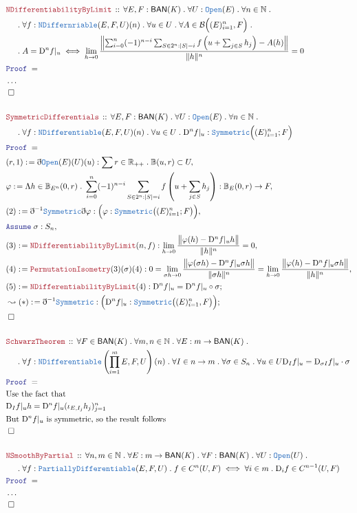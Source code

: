 \documentclass[12pt]{scrartcl}
\newcommand{\TYPE}[1]{\textcolor{NavyBlue}{\mathtt{#1}}}
\newcommand{\LOGIC}[1]{\textcolor{Blue}{\mathtt{#1}}}
\newcommand{\THM}[1]{\textcolor{Maroon}{\mathtt{#1}}}
\renewcommand{\.}{\; . \;}
\newcommand{\de}{: \kern 0.1pc =}
\newcommand{\Theorem}[2]{& \THM{#1} \, :: \, #2 \\ & \Proof = \\ }
\newcommand{\NewLine}{\\ & \kern 1pc}
\newcommand{\Page}[1]{\begin{align*} #1 \end{align*}   }
\newcommand{ \bd }{ \ByDef }
\newcommand{\NoProof}{ & \ldots \\ \EndProof}
\newcommand{\Reals}{\mathbb{R} }
\newcommand{\Nat}{\mathbb{N} }
\newcommand{\Say}[3]{& #1 \de #2 : #3, \\}
\newcommand{\Conclude}[3]{& #1 \de #2 : #3; \\}
\newcommand{\DeriveConclude}[3]{& \leadsto #1 \de #2 : #3 ; \\}
\newcommand{\A}{\LOGIC{Assume} \;}
\newcommand{\Assume}[2]{& \A #1 : #2, \\}
\newcommand{\QED}{\; \square}
\newcommand{\EndProof}{& \QED \\}
\newcommand{\ByDef}{\eth}
\newcommand{\Proof}{\LOGIC{Proof} \; }
\newcommand{\Ball}{ \mathbb{B} }
\newcommand{\BAN}{\mathsf{BAN}} %
\newcommand{\D}{\mathrm{D}}
\newcommand{\B}{\mathcal{B}}
\begin{document}
\Page{
	\Theorem{NDifferentiabilityByLimit}{
		\forall E,F : \BAN(K) \. \forall U : \TYPE{Open}(E) \. \forall n \in \Nat \.
		\NewLine \.
		\forall f : \TYPE{NDiffernriable}(E,F,U)(n) \.
		\forall u \in U \. \forall A \in \B\Big( (E )^n_{i = 1} , F \Big) \.
		\NewLine \.
		A = \D^n f |_u \iff 
		\lim_{h \to 0} \frac{\left\| \sum^n_{i=0} (-1)^{n-i} \sum_{S \in 2^n : |S| = i}f\left( u + \sum_{j \in S}h_j \right) - A(h)     \right\|}{\|h\|^n} = 0
	}
	\NoProof
	\\
	\Theorem{SymmetricDifferentials}{ 
		\forall E,F : \BAN(K) \. \forall U : \TYPE{Open}(E) \. \forall n \in \Nat \.
		\NewLine \.
		 \forall f : \TYPE{NDifferentiable}(E,F,U)(n) \.
		\forall u \in U \. \D^n f |_u : \TYPE{Symmetric}\Big( (E)^n_{i=1}  ; F\Big)
		}
	\Say{(r,1)}{\bd \TYPE{Open}(E)(U)(u)}{\sum r \in \Reals_{++} \. \Ball(u,r) \subset U}
	\Say{\varphi}{ \Lambda h \in \Ball_{E^n}(0,r) \. \sum^n_{i = 0}(-1)^{n - i} \sum_{S \in 2^n : |S| = i}f\left( u + \sum_{j \in S} h_j \right)   }{ \Ball_E(0,r) \to F }
	\Say{(2)}{\bd^{-1} \TYPE{Symmetric} \bd \varphi}{\Big( \varphi : \TYPE{Symmetric}\big( (E)^n_{i=1} ; F \big)  \Big)}
	\Assume{\sigma}{S_n}
	\Say{(3)}{\THM{NDifferentiabilityByLimit}(n,f)}{ \lim_{h \to 0 } \frac{\big\| \varphi(h) - \D^n f |_u h \big\|}{\|h\|^n} = 0   }
	\Say{(4)}{\THM{PermutationIsometry}(3)(\sigma)(4)}{ 
		0 = 
		\lim_{\sigma h \to 0} \frac{ \big\|\varphi(\sigma h) - \D^n f |_u \sigma h \big\|}{\|\sigma h\|^n} = 
		\lim_{h \to 0} \frac{\big\|\varphi(h) - \D^n f |_u \sigma h \big\|}{\| h \|^n}
	}
	\Conclude{(5)}{\THM{NDifferentiabilityByLimit}(4)}{\D^n f |_u = \D^n f |_u \circ \sigma}
	\DeriveConclude{(*)}{\bd^{-1}\TYPE{Symmetric}}{\Big( \D^n f |_u : \TYPE{Symmetric}\big((E)^n_{i=1},F\big) \Big)}
	\EndProof
	\\
	\Theorem{SchwarzTheorem}{ \forall F \in \BAN(K) \. \forall m,n \in \Nat \. \forall E : m \to \BAN(K) \. \NewLine \.  
		\forall f : \TYPE{NDifferentiable}\left(\prod^m_{i = 1}E,F,U\right)(n) \. 
		\forall I \in n \to m \. \forall \sigma \in S_n \. \forall u \in U  \D_{ I} f|_u = \D_{ \sigma I } f |_u \cdot \sigma            
	}
	& \textrm{Use the fact that} \\
	&  \D_{I} f |_u  h = \D^n f |_u    ( \iota_{E,I_j} h_j)^n_{j = 1} \\
	& \textrm{But $\D^n f |_u$ is symmetric, so the result follows } \\
	\EndProof
	\\
	\Theorem{NSmoothByPartial}{ 
		\forall n,m \in \Nat \. \forall E : m \to \BAN(K) \. \forall F : \BAN(K) \. \forall U : \TYPE{Open}(U) \.
		\NewLine \.
		\forall f : \TYPE{PartiallyDifferentiable}(E,F,U) \.  
		f \in C^n(U,F) \iff \forall i \in m \. \D_i f \in C^{n-1}(U,F)
		}
	\NoProof
}
\end{document}
